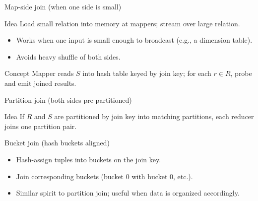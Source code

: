 \documentclass[10pt,aspectratio=169]{beamer}
\newenvironment{examplebox}[1][Example]{\begin{exampleblock}{#1}}{\end{exampleblock}}
\begin{document}
\begin{frame}{Map-side join (when one side is small)}
\begin{block}{Idea}
Load small relation into memory at mappers; stream over large relation.
\end{block}
\begin{itemize}
  \item Works when one input is small enough to broadcast (e.g., a dimension table).
  \item Avoids heavy shuffle of both sides.
\end{itemize}

\begin{examplebox}[Concept]
Mapper reads \(S\) into hash table keyed by join key; for each \(r\in R\), probe and emit joined results.
\end{examplebox}
\end{frame}

\begin{frame}{Partition join (both sides pre-partitioned)}
\begin{block}{Idea}
If \(R\) and \(S\) are partitioned by join key into matching partitions, each reducer joins one partition pair.
\end{block}

\centering
{}
\end{frame}

\begin{frame}{Bucket join (hash buckets aligned)}
\begin{itemize}
  \item Hash-assign tuples into buckets on the join key.
  \item Join corresponding buckets (bucket 0 with bucket 0, etc.).
  \item Similar spirit to partition join; useful when data is organized accordingly.
\end{itemize}
\end{frame}
\end{document}
